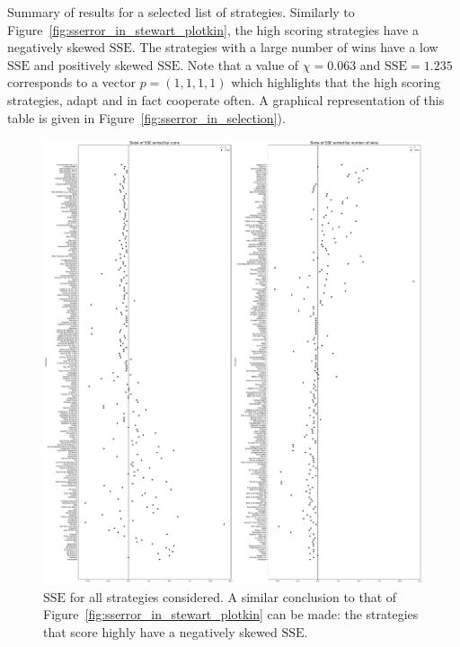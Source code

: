 \documentclass[a4paper]{article}
\newcommand{\SSe}{\text{SSE}}
\begin{document}
\begin{table}[!hbtp]
    \begin{center}
    \tiny
    
    \end{center}
    \caption{Summary of results for a selected list of strategies. Similarly to
        Figure~\ref{fig:sserror_in_stewart_plotkin}, the high scoring strategies
        have a negatively skewed \(\SSe\). The strategies with a
        large number of wins have a low \(\SSe\) and positively skewed
        \(\SSe\). Note that a value of \(\chi=0.063\) and \(\SSe=1.235\)
        corresponds to a vector \(p=(1,1,1,1)\) which highlights that the high
        scoring strategies, adapt and in fact cooperate often. A graphical
        representation of this table is given in
        Figure~\ref{fig:sserror_in_selection}).}
    \label{tbl:overall_summary_results}
\end{table}

\begin{figure}[!htbp]
    \centering
    \includegraphics[width=\textwidth]{./assets/img/sserror_in_std/main.pdf}
    \caption{\(\SSe\) for all strategies considered.
        A similar conclusion to that of
        Figure~\ref{fig:sserror_in_stewart_plotkin} can be made: the strategies
        that score highly have a negatively skewed \(\SSe\).}
        \label{fig:sserror_in_std}
\end{figure}
\end{document}
